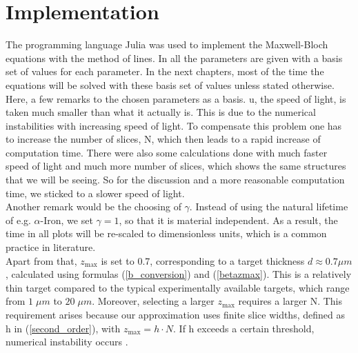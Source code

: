 

\section{Implementation}
The programming language Julia \cite{Julia-2017} was used to implement the Maxwell-Bloch equations with the method of lines. In  all the parameters are given with a basis set of values for each parameter. In the next chapters, most of the time the equations will be solved with these basis set of values unless stated otherwise.\\

Here, a few remarks to the chosen parameters as a basis. u, the speed of light, is taken much smaller than what it actually is. This is due to the numerical instabilities with increasing speed of light. To compensate this problem one has to increase the number of slices, N, which then leads to a rapid increase of computation time. There were also some calculations done with much faster speed of light and much more number of slices, which shows the same structures that we will be seeing. So for the discussion and a more reasonable computation time, we sticked to a slower speed of light.\\

Another remark would be the choosing of $\gamma$. Instead of using the natural lifetime of e.g. $\alpha$-Iron, we set $\gamma = 1$, so that it is material independent. As a result, the time in all plots will be re-scaled to dimensionless units, which is a common practice in literature.\\

Apart from that, $z_\mathrm{max}$ is set to 0.7, corresponding to a target thickness $d \approx 0.7 \mu m$, calculated using formulas (\ref{b_conversion}) and (\ref{betazmax}). This is a relatively thin target compared to the typical experimentally available targets, which range from $1\;\mu m$ to $20\; \mu m$. Moreover, selecting a larger $z_\mathrm{max}$ requires a larger N. This requirement arises because our approximation uses finite slice widths, defined as h in (\ref{second_order}), with $z_\mathrm{max} = h \cdot N$. If h exceeds a certain threshold, numerical instability occurs \cite{Hamdi:2007}.\\

